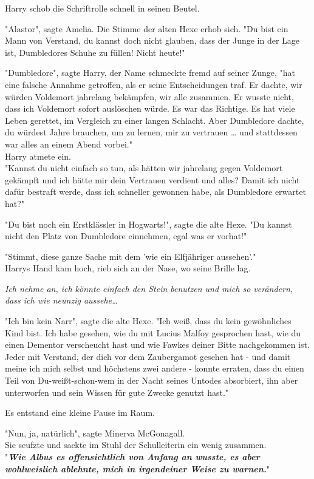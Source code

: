 {Harry schob die Schriftrolle schnell in seinen Beutel.

"Alastor", sagte Amelia. Die Stimme der alten Hexe erhob sich. "Du bist ein Mann von Verstand, du kannst doch nicht glauben, dass der Junge in der Lage ist, Dumbledores Schuhe zu füllen! Nicht heute!"

"Dumbledore", sagte Harry, der Name schmeckte fremd auf seiner Zunge, "hat eine falsche Annahme getroffen, als er seine Entscheidungen traf. Er dachte, wir würden Voldemort jahrelang bekämpfen, wir alle zusammen. Er wusste nicht, dass ich Voldemort sofort auslöschen würde. Es war das Richtige. Es hat viele Leben gerettet, im Vergleich zu einer langen Schlacht. Aber Dumbledore dachte, du würdest Jahre brauchen, um zu lernen, mir zu vertrauen … und stattdessen war alles an einem Abend vorbei."\\ Harry atmete ein.\\ "Kannst du nicht einfach so tun, als hätten wir jahrelang gegen Voldemort gekämpft und ich hätte mir dein Vertrauen verdient und alles? Damit ich nicht dafür bestraft werde, dass ich schneller gewonnen habe, als Dumbledore erwartet hat?"

"Du bist noch ein Erstklässler in Hogwarts!", sagte die alte Hexe. "Du kannst nicht den Platz von Dumbledore einnehmen, egal was er vorhat!"

"Stimmt, diese ganze Sache mit dem 'wie ein Elfjähriger aussehen'."\\ Harrys Hand kam hoch, rieb sich an der Nase, wo seine Brille lag.

\emph{Ich nehme an, ich könnte einfach den Stein benutzen und mich so verändern, dass ich wie neunzig aussehe…}

"Ich bin kein Narr", sagte die alte Hexe. "Ich weiß, dass du kein gewöhnliches Kind bist. Ich habe gesehen, wie du mit Lucius Malfoy gesprochen hast, wie du einen Dementor verscheucht hast und wie Fawkes deiner Bitte nachgekommen ist.\\ Jeder mit Verstand, der dich vor dem Zaubergamot gesehen hat - und damit meine ich mich selbst und höchstens zwei andere - konnte erraten, dass du einen Teil von Du-weißt-schon-wem in der Nacht seines Untodes absorbiert, ihn aber unterworfen und sein Wissen für gute Zwecke genutzt hast."

Es entstand eine kleine Pause im Raum.

"Nun, ja, natürlich", sagte Minerva McGonagall.\\ Sie seufzte und sackte im Stuhl der Schulleiterin ein wenig zusammen.\\ "\textbf{\emph{Wie Albus es offensichtlich von Anfang an wusste, es aber wohlweislich ablehnte, mich in irgendeiner Weise zu warnen.}}"

}
